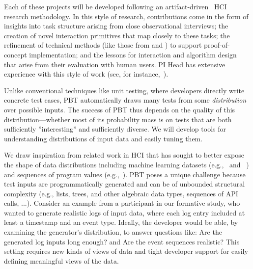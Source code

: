 Each of these projects will be developed following an 
artifact-driven~\cite{ref:wobbrock2016research} HCI research methodology.
In this style of research, contributions come in the form of insights into task 
structure arising from close observational interviews; the creation of novel 
interaction primitives that map closely to these tasks; the refinement of 
technical methods (like those from  and 
) to support proof-of-concept implementation; and the 
lessons for interaction and algorithm design that arise from their evaluation 
with human users.  PI Head has extensive experience with this style of work 
(see, for 
instance,~\cite{ref:head2015tutorons,ref:suzuki2017tracediff,ref:head2017writing,ref:head2018when,ref:head2018interactive,ref:head2019managing,ref:head2020composing}).

%
Unlike conventional techniques like unit testing, where developers
directly write concrete test cases,
PBT automatically draws many tests from some
{\em distribution} over possible inputs. The success of
PBT thus depends on the quality of this distribution---whether
most of its probability mass is on tests that are both sufficiently
''interesting'' and sufficiently diverse. We will develop
tools 
for
understanding distributions of input data and easily tuning them.

We draw inspiration from related work in HCI that has sought to better expose
the shape of data distributions including
machine learning datasets
(e.g.,~\cite{ref:hohman2019gamut} and
~\cite{ref:hohman2020understanding}) and sequences of program values
(e.g.,~\cite{ref:kang2017omnicode}).
PBT poses a unique challenge because test inputs are
programmatically generated and
can be of unbounded structural
complexity (e.g., lists, trees, and other algebraic data types,
sequences of API calls, ...).
Consider an
example from a participant in our formative study, who wanted to generate
realistic logs of input data, where each log entry included at least a timestamp
and an event type.
Ideally, the developer would be able, by examining the generator's
distribution, to answer
questions like: Are the generated log inputs long enough? and Are the
event sequences
realistic?  This setting requires new kinds of views of data and tight
developer support for easily defining meaningful views of the data.


